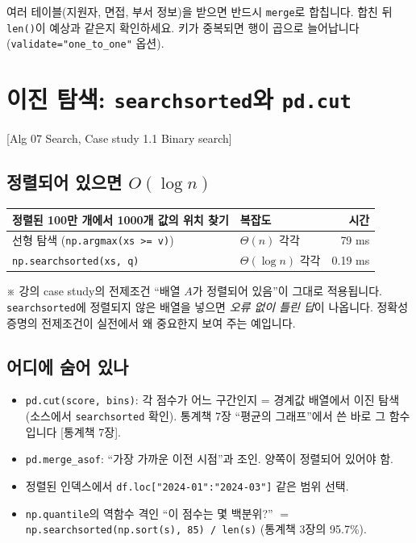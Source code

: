 \documentclass[11pt,a4paper]{article}
\newcommand{\code}[1]{\texttt{#1}}
\newcommand{\aref}[1]{{\footnotesize\textsf{\color{blue!55!black}[Alg #1]}}}
\newcommand{\sref}[1]{{\footnotesize\textsf{\color{green!40!black}[통계책 #1]}}}
\newcommand{\aside}[1]{{\footnotesize\color{black!65}#1}}
\begin{document}
\begin{dtbox}
여러 테이블(지원자, 면접, 부서 정보)을 받으면 반드시 \code{merge}로 합칩니다. 합친 뒤 \code{len()}이 예상과 같은지 확인하세요. 키가 중복되면 행이 곱으로 늘어납니다 (\code{validate="one\_to\_one"} 옵션).
\end{dtbox}

\section{이진 탐색: \code{searchsorted}와 \code{pd.cut}}
\aref{07 Search, Case study 1.1 Binary search}

\subsection{정렬되어 있으면 $O(\log n)$}
\begin{center}
\begin{tabular}{@{}l l r@{}}
\toprule
정렬된 100만 개에서 1000개 값의 위치 찾기 & 복잡도 & 시간 \\
\midrule
선형 탐색 (\code{np.argmax(xs >= v)}) & $\Theta(n)$ 각각 & 79 ms \\
\code{np.searchsorted(xs, q)} & $\Theta(\log n)$ 각각 & 0.19 ms \\
\bottomrule
\end{tabular}
\end{center}
\aside{※ 강의 case study의 전제조건 ``배열 $A$가 정렬되어 있음''이 그대로 적용됩니다. \code{searchsorted}에 정렬되지 않은 배열을 넣으면 \emph{오류 없이 틀린 답}이 나옵니다. 정확성 증명의 전제조건이 실전에서 왜 중요한지 보여 주는 예입니다.}

\subsection{어디에 숨어 있나}
\begin{itemize}
\item \code{pd.cut(score, bins)}: 각 점수가 어느 구간인지 = 경계값 배열에서 이진 탐색 (소스에서 \code{searchsorted} 확인). 통계책 7장 ``평균의 그래프''에서 쓴 바로 그 함수입니다 \sref{7장}.
\item \code{pd.merge\_asof}: ``가장 가까운 이전 시점''과 조인. 양쪽이 정렬되어 있어야 함.
\item 정렬된 인덱스에서 \code{df.loc["2024-01":"2024-03"]} 같은 범위 선택.
\item \code{np.quantile}의 역함수 격인 ``이 점수는 몇 백분위?'' $=$ \code{np.searchsorted(np.sort(s), 85) / len(s)} (통계책 3장의 95.7\%).
\end{itemize}
\end{document}
